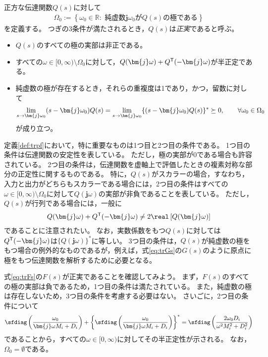 \documentclass[tombow,dvipdfmx]{corona-a5}
\begin{document}
\begin{定義}[伝達関数の正実性]\label{def:trpf}
正方な伝達関数$Q(s)$に対して
\begin{align}\label{eq:defOm0}
\Omega_0 := \left\{
\omega_0 \in \mathbb{R}: 
\mbox{ 純虚数$\bm{j} \omega_0$が$Q(s)$の極である}
\right\}
\end{align}
を定義する。
つぎの3条件が満たされるとき，$Q(s)$は\emph{正実}であると呼ぶ。
\begin{itemize}
\item $Q(s)$のすべての極の実部は非正である。
\item すべての$\omega \in [0,\infty)\setminus \Omega_0$に対して，$Q(\bm{j} \omega) + Q^{\sf T}(-\bm{j} \omega)$が半正定である。
\item 純虚数の極が存在するとき，それらの重複度は1であり，かつ，留数に対して
\begin{align*}
\lim_{s \rightarrow \bm{j} \omega_0} (s-\bm{j} \omega_0) Q(s) = \lim_{s\rightarrow \bm{j} \omega_0} \{ (s-\bm{j} \omega_0) Q(s)\}^{\sf *}\succeq 0
,\qquad
\forall \omega_0 \in \Omega_0
\end{align*}
が成り立つ。
\end{itemize}
\end{定義}

定義\ref{def:trpf}において，特に重要なものは1つ目と2つ目の条件である。
1つ目の条件は伝達関数の安定性を表している。
ただし，極の実部が0である場合も許容されている。
2つ目の条件は，伝達関数を虚軸上で評価したときの複素対称な部分の正定性に関するものである。
特に，$Q(s)$がスカラーの場合，すなわち，入力と出力がどちらもスカラーである場合には，2つ目の条件はすべての$\omega \in [0,\infty)\setminus \Omega_0$に対して$Q(\bm{j}\omega)$の実部が非負であることを表している。
ただし，$Q(s)$が行列である場合には，一般に
\begin{align*}
Q(\bm{j} \omega) + Q^{\sf T}(-\bm{j} \omega) \neq 2 \real\left[ Q(\bm{j} \omega) \right]
\end{align*}
であることに注意されたい。
なお，実数係数をもつ$Q(s)$に対しては$Q^{\sf T}( -\bm{j} \omega)$は$\{Q(\bm{j} \omega)\}^*$に等しい。
3つ目の条件は，$Q(s)$が純虚数の極をもつ場合の例外的なものであるが，例えば，式\ref{eq:trGs}の$G(s)$のように原点に極をもつ伝達関数を解析するために必要となる。

\begin{例}\label{ex:Fspr1}
式\ref{eq:trFs}の$F(s)$が正実であることを確認してみよう。
まず，$F(s)$のすべての極の実部は負であるため，1つ目の条件は満たされている。
また，純虚数の極は存在しないため，3つ目の条件を考慮する必要はない。
さいごに，2つ目の条件について
\begin{align*}
\sfdiag \left( 
\frac{\omega_0}{ \bm{j} \omega M_i + D_i}
\right)
+
\left\{
\sfdiag \left( 
\frac{\omega_0}{\bm{j} \omega M_i + D_i}
\right)
\right\}^*
=
\sfdiag \left( 
\frac{2 \omega_0 D_i}{\omega^2 M_i^2 + D_i^2}
\right)
\end{align*}
であることから，すべての$\omega\in [0,\infty)$に対してその半正定性が示される。
なお，$\Omega_0=\emptyset$である。
\end{例}
\end{document}
